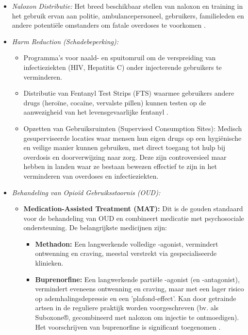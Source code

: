 \documentclass[11pt, a4paper]{report} %
\begin{document}
\begin{itemize}
        \begin{itemize}
            \item \textit{Naloxon Distributie:} Het breed beschikbaar stellen van naloxon en training in het gebruik ervan aan politie, ambulancepersoneel, gebruikers, familieleden en andere potentiële omstanders om fatale overdoses te voorkomen \parencite{CDCPreventingOverdose}.
            \item \textit{Harm Reduction (Schadebeperking):}
                \begin{itemize}
                    \item Programma's voor naald- en spuitomruil om de verspreiding van infectieziekten (HIV, Hepatitis C) onder injecterende gebruikers te verminderen.
                    \item Distributie van Fentanyl Test Strips (FTS) waarmee gebruikers andere drugs (heroïne, cocaïne, vervalste pillen) kunnen testen op de aanwezigheid van het levensgevaarlijke fentanyl \parencite{CDCPreventingOverdose}.
                    \item Opzetten van Gebruiksruimten (Supervised Consumption Sites): Medisch gesuperviseerde locaties waar mensen hun eigen drugs op een hygiënische en veilige manier kunnen gebruiken, met direct toegang tot hulp bij overdosis en doorverwijzing naar zorg. Deze zijn controversieel maar hebben in landen waar ze bestaan bewezen effectief te zijn in het verminderen van overdoses en infectieziekten.
                \end{itemize}
            \item \textit{Behandeling van Opioïd Gebruiksstoornis (OUD):}
                \begin{itemize}
                    \item \textbf{Medication-Assisted Treatment (MAT):} Dit is de gouden standaard voor de behandeling van OUD en combineert medicatie met psychosociale ondersteuning. De belangrijkste medicijnen zijn:
                        \begin{itemize}
                            \item \textbf{Methadon:} Een langwerkende volledige \textmu-agonist, vermindert ontwenning en craving, meestal verstrekt via gespecialiseerde klinieken.
                            \item \textbf{Buprenorfine:} Een langwerkende partiële \textmu-agonist (en \textkappa-antagonist), vermindert eveneens ontwenning en craving, maar met een lager risico op ademhalingsdepressie en een 'plafond-effect'. Kan door getrainde artsen in de reguliere praktijk worden voorgeschreven (bv. als Suboxone®, gecombineerd met naloxon om injectie te ontmoedigen). Het voorschrijven van buprenorfine is significant toegenomen \parencite{CDCPreventingOverdose}.

\end{itemize}
\end{itemize}
\end{itemize}
\end{itemize}
\end{document}
